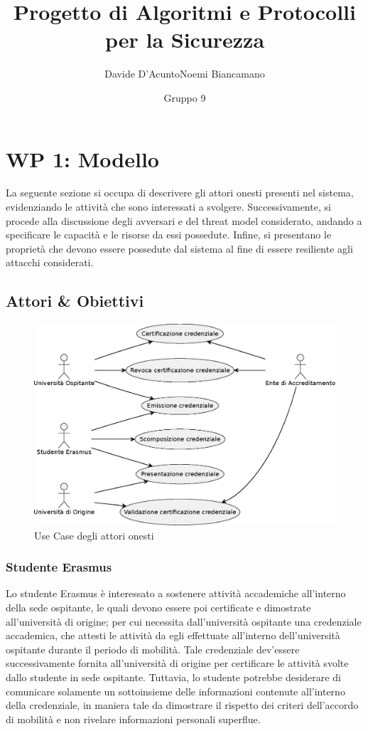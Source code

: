 \documentclass[a4paper,12pt]{article}
\title{Progetto di Algoritmi e Protocolli per la Sicurezza}
\author{Davide D'Acunto\quad Noemi Biancamano}
\date{Gruppo 9}
\begin{document}
\maketitle

\tableofcontents
\newpage
\section{WP 1: Modello}
La seguente sezione si occupa di descrivere gli attori onesti presenti nel sistema, evidenziando le attività che sono interessati a svolgere.
\newline Successivamente, si procede alla discussione degli avversari e del threat model considerato, andando a specificare le capacità e le risorse da essi possedute. Infine, si presentano le proprietà che devono essere possedute dal sistema al fine di essere resiliente agli attacchi considerati.
\subsection{Attori \& Obiettivi}
\begin{figure}[H]
    \centering
    \includegraphics[width=\textwidth]{usecase_1.eps}
    \caption{Use Case degli attori onesti}
    \label{fig:usecase1}
\end{figure}
\subsubsection{Studente Erasmus}
Lo studente Erasmus è interessato a sostenere attività accademiche all'interno della sede ospitante, le quali devono essere poi certificate e dimostrate all'università di origine; per cui necessita dall'università ospitante una credenziale accademica, che attesti le attività da egli effettuate all'interno dell'università ospitante durante il periodo di mobilità. 
\newline Tale credenziale dev'essere successivamente fornita all'università di origine per certificare le attività svolte dallo studente in sede ospitante. Tuttavia, lo studente potrebbe desiderare di comunicare solamente un sottoinsieme delle informazioni contenute all'interno della credenziale, in maniera tale da dimostrare il rispetto dei criteri dell'accordo di mobilità e non rivelare informazioni personali superflue.
\end{document}
